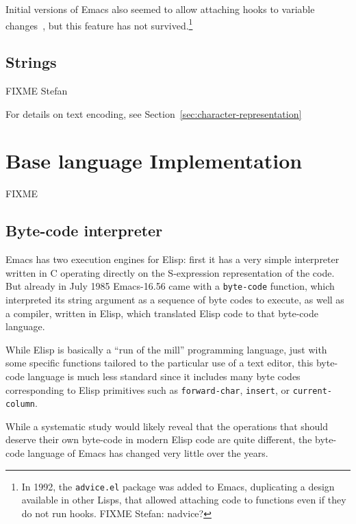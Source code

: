 \documentclass[format=acmsmall, review=false, screen=true]{acmart}
\newcommand \Elisp {Elisp}
\begin{document}
Initial versions of Emacs also seemed to allow attaching hooks to
variable changes~\cite{Stallman1981}, but this feature has not
survived.\footnote{In 1992, the \texttt{advice.el} package was added
  to Emacs, duplicating a design available in other Lisps, that
  allowed attaching code to functions even if they do not run hooks.
  FIXME Stefan: nadvice?}

\subsection{Strings}

FIXME Stefan

For details on text encoding, see Section~\ref{sec:character-representation}

\section{Base language Implementation}
\label{sec:base-language-implementation}

FIXME

\subsection{Byte-code interpreter}


Emacs has two execution engines for \Elisp: first it has a very simple
interpreter written in C operating directly on the S-expression
representation of the code.  But already in July 1985 Emacs-16.56 came with
a \texttt{byte-code} function, which interpreted its string argument as
a sequence of byte codes to execute, as well as a compiler, written in
\Elisp{}, which translated \Elisp{} code to that byte-code language.

While \Elisp{} is basically a ``run of the mill'' programming language, just
with some specific functions tailored to the particular use of a text
editor, this byte-code language is much less standard since it includes many
byte codes corresponding to \Elisp{} primitives such as
\texttt{forward-char}, \texttt{insert}, or \texttt{current-column}.

While a systematic study would likely reveal that the operations that should
deserve their own byte-code in modern \Elisp{} code are quite different, the
byte-code language of Emacs has changed very little over the years.
\end{document}
